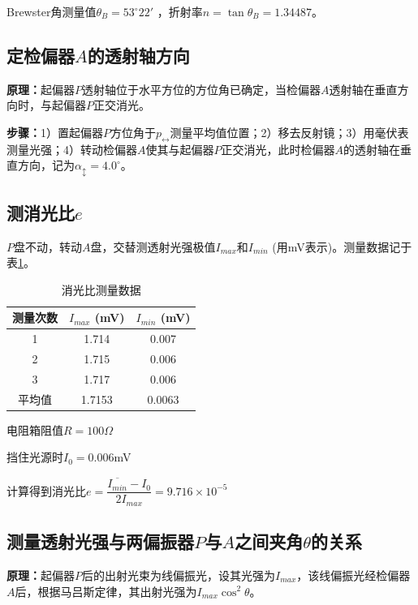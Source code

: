 \documentclass[UTF8]{ctexart}
\newcommand\dg[2]{#1^{\circ}#2'}
\begin{document}
Brewster角测量值$\theta_B=\dg{53}{22}$ ，折射率$n = \tan\theta_B = 1.34487$。

\subsection{定检偏器$A$的透射轴方向}

\textbf{原理：}起偏器$P$透射轴位于水平方位的方位角已确定，当检偏器$A$透射轴在垂直方向时，与起偏器$P$正交消光。

\textbf{步骤：}1）置起偏器$P$方位角于$p_{\leftrightarrow}$测量平均值位置；2）移去反射镜；3）用毫伏表测量光强；4）转动检偏器$A$使其与起偏器$P$正交消光，此时检偏器$A$的透射轴在垂直方向，记为$\alpha_{\updownarrow}=4.0^{\circ}$。

\subsection{测消光比$e$}

$P$盘不动，转动$A$盘，交替测透射光强极值$I_{max}$和$I_{min}$ (用mV表示)。测量数据记于表\ref{tab:1.4.1}。

\begin{table}[h]
    \centering
    \begin{tabular}{|c|c|c|}
    \hline
        测量次数 & $I_{max}$ (mV) & $I_{min}$ (mV) \\ \hline
        1 & 1.714 & 0.007 \\ \hline
        2 & 1.715 & 0.006 \\ \hline
        3 & 1.717 & 0.006 \\ \hline
        平均值 & 1.7153 & 0.0063 \\ \hline
    \end{tabular}
    \caption{消光比测量数据}
    \label{tab:1.4.1}
\end{table}

电阻箱阻值$R=100\Omega$

挡住光源时$I_0=0.006$mV

计算得到消光比$e = \dfrac{\overline {I_{min}} - I_0}{2I_{max}} =9.716\times10^{-5}$

\subsection{测量透射光强与两偏振器$P$与$A$之间夹角$\theta$的关系}

\textbf{原理：}起偏器$P$后的出射光束为线偏振光，设其光强为$I_{max}$，该线偏振光经检偏器$A$后，根据马吕斯定律，其出射光强为$I_{max}\cos^2\theta$。
\end{document}
